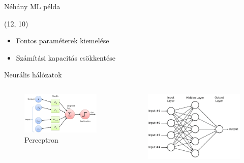 \documentclass[aspectratio=169]{beamer}
\begin{document}
\begin{frame}{Néhány ML példa}
    \begin{textblock}{3}(12, 10)
        \tiny
        \begin{itemize}
            \item Fontos paraméterek kiemelése
            \item Számítási kapacitás csökkentése
        \end{itemize}
    \end{textblock}

\end{frame}

\begin{frame}{Neurális hálózatok}
    \begin{columns}[b]
        \begin{column}{0.48\textwidth}
            \begin{figure}
                \centering
                \includegraphics[width=\textwidth]{./tex_images/perceptron.png}
                \caption*{Perceptron\footnotemark[1]}
            \end{figure}
        \end{column}
        \begin{column}{0.48\textwidth}
            \begin{figure}
                \centering
                \includegraphics[width=\textwidth]{./tex_images/multi_perceptron.png}

\end{figure}
\end{column}
\end{columns}
\end{frame}
\end{document}
